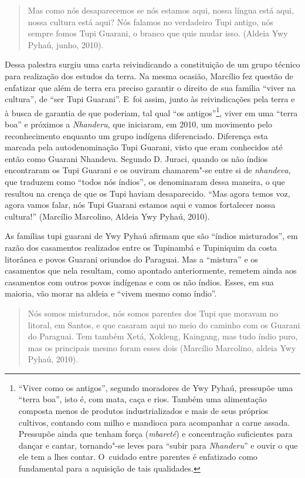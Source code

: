 \begin{quote}
\noindent
Mas como nós desaparecemos se nós estamos aqui, nossa língua está aqui,
nossa cultura está aqui? Nós falamos no verdadeiro Tupi antigo, nós
sempre fomos Tupi Guarani, o branco que quis mudar isso. (Aldeia Ywy
Pyhaú, junho, 2010).
\end{quote}

Dessa palestra surgiu uma carta reivindicando a constituição de um grupo
técnico para realização dos estudos da terra. Na mesma ocasião,
Marcílio fez questão de enfatizar que além de terra era preciso
garantir o direito de sua família ``viver na cultura'', de ``ser Tupi
Guarani''. E~foi assim, junto às reivindicações pela terra e à busca de
garantia de que poderiam, tal qual ``os antigos''\footnote{``Viver como os
antigos'', segundo moradores de Ywy Pyhaú, pressupõe uma ``terra boa'', isto
é, com mata, caça e rios. Também uma alimentação composta menos de
produtos industrializados e mais de seus próprios cultivos, contando
com milho e mandioca para acompanhar a carne assada. Pressupõe ainda
que tenham força (\emph{mbareté}) e concentração suficientes para dançar e
cantar, tornando"-se leves para ``subir para \emph{Nhanderu}'' e ouvir o que ele
tem a lhes contar. O~cuidado entre parentes é enfatizado como
fundamental para a aquisição de tais qualidades.}, viver em uma ``terra
boa'' e próximos a \emph{Nhanderu}, que iniciaram, em 2010, um movimento pelo
reconhecimento enquanto um grupo indígena diferenciado. Diferença esta
marcada pela autodenominação Tupi Guarani, visto que eram conhecidos
até então como Guarani Nhandeva. Segundo D. Juraci, quando os não
índios encontraram os Tupi Guarani e os ouviram chamarem"-se entre si de
\emph{nhandeva}, que traduzem como ``todos nós índios'', os denominaram dessa
maneira, o que resultou na crença de que os Tupi haviam desaparecido.
``Mas agora temos voz, agora vamos falar, nós Tupi Guarani estamos aqui
e vamos fortalecer nossa cultura!'' (Marcílio Marcolino, Aldeia Ywy
Pyhaú, 2010).

As famílias tupi guarani de Ywy Pyhaú afirmam que são ``índios misturados'',
em razão dos casamentos realizados entre os Tupinambá e Tupiniquim da
costa litorânea e povos Guarani oriundos do Paraguai. Mas a ``mistura'' e
os casamentos que nela resultam, como apontado anteriormente, remetem
ainda aos casamentos com outros povos indígenas e com os não índios.
Esses, em sua maioria, vão morar na aldeia e ``vivem mesmo como índio''.

\begin{quote}
\noindent
Nós somos misturados, nós somos parentes dos Tupi que moravam no
litoral, em Santos, e que casaram aqui no meio do caminho com os
Guarani do Paraguai. Tem também Xetá, Xokleng, Kaingang, mas tudo índio
puro, mas os principais mesmo foram esses dois (Marcílio Marcolino,
aldeia Ywy Pyhaú, 2010).
\end{quote}

